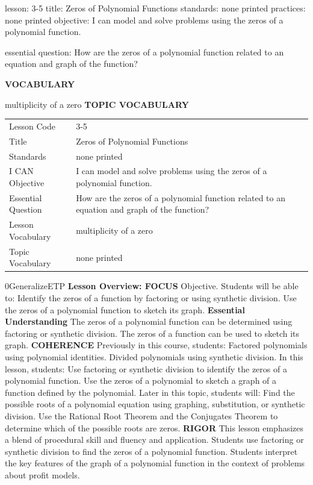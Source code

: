 \documentclass{article}
\newenvironment{lesson-meta}{}{}        %
\newenvironment{te-addendum}[2]{}{}     %
\newcommand{\te}[1]{}                   %
\begin{document}
\begin{lesson-meta}
lesson: 3-5
title: Zeros of Polynomial Functions
standards: none printed
practices: none printed
objective: I can model and solve problems using the zeros of a polynomial function.

essential question: How are the zeros of a polynomial function related to an equation and graph of the function?

\textbf{VOCABULARY}
\item multiplicity of a zero
\textbf{TOPIC VOCABULARY}
\te{No separate topic vocabulary list is printed on these lesson pages.}
\begin{tabular}{ll}
Lesson Code & 3-5 \\
Title & Zeros of Polynomial Functions \\
Standards & none printed \\
I CAN Objective & I can model and solve problems using the zeros of a polynomial function. \\
Essential Question & How are the zeros of a polynomial function related to an equation and graph of the function? \\
Lesson Vocabulary & multiplicity of a zero \\
Topic Vocabulary & none printed \\
\end{tabular}
\end{lesson-meta}
\begin{te-addendum}{0}{GeneralizeETP}
\textbf{Lesson Overview: FOCUS}
Objective. Students will be able to:
Identify the zeros of a function by factoring or using synthetic division.
Use the zeros of a polynomial function to sketch its graph.
\textbf{Essential Understanding}
The zeros of a polynomial function can be determined using factoring or synthetic division. The zeros of a function can be used to sketch its graph.
\textbf{COHERENCE}
Previously in this course, students:
Factored polynomials using polynomial identities.
Divided polynomials using synthetic division.
In this lesson, students:
Use factoring or synthetic division to identify the zeros of a polynomial function.
Use the zeros of a polynomial to sketch a graph of a function defined by the polynomial.
Later in this topic, students will:
Find the possible roots of a polynomial equation using graphing, substitution, or synthetic division.
Use the Rational Root Theorem and the Conjugates Theorem to determine which of the possible roots are zeros.
\textbf{RIGOR}
This lesson emphasizes a blend of procedural skill and fluency and application.
Students use factoring or synthetic division to find the zeros of a polynomial function.
Students interpret the key features of the graph of a polynomial function in the context of problems about profit models.
\end{te-addendum}
\end{document}
